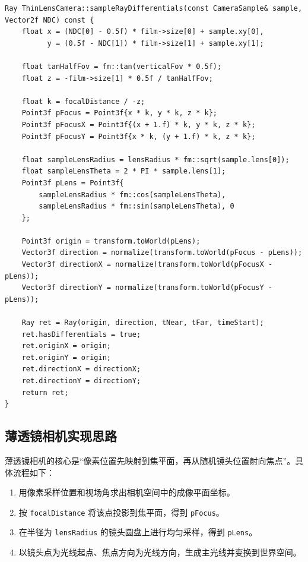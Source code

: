 \documentclass{article}
\begin{document}
\begin{lstlisting}[style=cppstyle]
Ray ThinLensCamera::sampleRayDifferentials(const CameraSample& sample, Vector2f NDC) const {
    float x = (NDC[0] - 0.5f) * film->size[0] + sample.xy[0],
          y = (0.5f - NDC[1]) * film->size[1] + sample.xy[1];

    float tanHalfFov = fm::tan(verticalFov * 0.5f);
    float z = -film->size[1] * 0.5f / tanHalfFov;

    float k = focalDistance / -z;
    Point3f pFocus = Point3f{x * k, y * k, z * k};
    Point3f pFocusX = Point3f{(x + 1.f) * k, y * k, z * k};
    Point3f pFocusY = Point3f{x * k, (y + 1.f) * k, z * k};

    float sampleLensRadius = lensRadius * fm::sqrt(sample.lens[0]);
    float sampleLensTheta = 2 * PI * sample.lens[1];
    Point3f pLens = Point3f{
        sampleLensRadius * fm::cos(sampleLensTheta),
        sampleLensRadius * fm::sin(sampleLensTheta), 0
    };

    Point3f origin = transform.toWorld(pLens);
    Vector3f direction = normalize(transform.toWorld(pFocus - pLens));
    Vector3f directionX = normalize(transform.toWorld(pFocusX - pLens));
    Vector3f directionY = normalize(transform.toWorld(pFocusY - pLens));

    Ray ret = Ray(origin, direction, tNear, tFar, timeStart);
    ret.hasDifferentials = true;
    ret.originX = origin;
    ret.originY = origin;
    ret.directionX = directionX;
    ret.directionY = directionY;
    return ret;
}
\end{lstlisting}

\subsection{薄透镜相机实现思路}

薄透镜相机的核心是“像素位置先映射到焦平面，再从随机镜头位置射向焦点”。具体流程如下：
\begin{enumerate}
    \item 用像素采样位置和视场角求出相机空间中的成像平面坐标。
    \item 按 \texttt{focalDistance} 将该点投影到焦平面，得到 \texttt{pFocus}。
    \item 在半径为 \texttt{lensRadius} 的镜头圆盘上进行均匀采样，得到 \texttt{pLens}。
    \item 以镜头点为光线起点、焦点方向为光线方向，生成主光线并变换到世界空间。
\end{enumerate}
\end{document}
